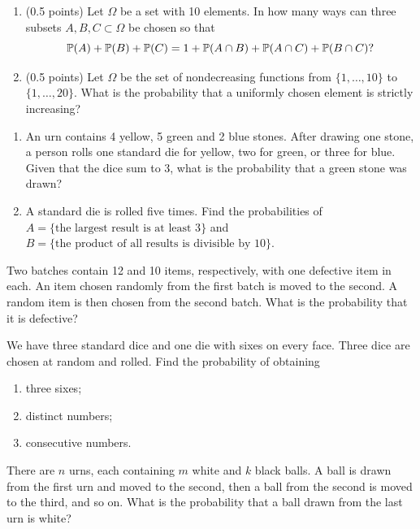 \documentclass[a4paper]{report}
\begin{document}
\begin{problempencil}[E, CS 2024]
\begin{enumerate}
\item (0.5 points) Let $\Omega$ be a set with 10 elements. In how many ways can three subsets $A,B,C\subset\Omega$ be chosen so that
\[\P(A)+\P(B)+\P(C)=1+\P(A\cap B)+\P(A\cap C)+\P(B\cap C)?\]
\item (0.5 points) Let $\Omega$ be the set of nondecreasing functions from $\{1,\dots,10\}$ to $\{1,\dots,20\}$. What is the probability that a uniformly chosen element is strictly increasing?
\end{enumerate}
\end{problempencil}
\begin{problempencil}[T1, SE 2023]
\begin{enumerate}
\item An urn contains 4 yellow, 5 green and 2 blue stones. After drawing one stone, a person rolls one standard die for yellow, two for green, or three for blue. Given that the dice sum to 3, what is the probability that a green stone was drawn?
\item A standard die is rolled five times. Find the probabilities of
$A=\{\text{the largest result is at least 3}\}$ and
$B=\{\text{the product of all results is divisible by 10}\}$.
\end{enumerate}
\end{problempencil}
\begin{problembook}
Two batches contain 12 and 10 items, respectively, with one defective item in each. An item chosen randomly from the first batch is moved to the second. A random item is then chosen from the second batch. What is the probability that it is defective?
\end{problembook}
\begin{problembook}
We have three standard dice and one die with sixes on every face. Three dice are chosen at random and rolled. Find the probability of obtaining
\begin{enumerate}\item three sixes;\item distinct numbers;\item consecutive numbers.\end{enumerate}
\end{problembook}
\begin{problem}
There are $n$ urns, each containing $m$ white and $k$ black balls. A ball is drawn from the first urn and moved to the second, then a ball from the second is moved to the third, and so on. What is the probability that a ball drawn from the last urn is white?
\end{problem}
\end{document}
